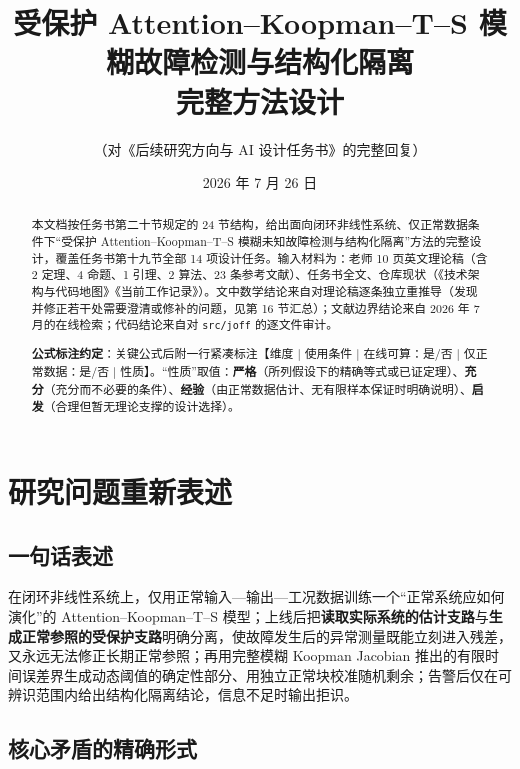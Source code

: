 \documentclass[11pt,a4paper]{ctexart}
\title{\textbf{受保护 Attention--Koopman--T--S 模糊故障检测与结构化隔离\\完整方法设计}}
\author{（对《后续研究方向与 AI 设计任务书》的完整回复）}
\date{2026 年 7 月 26 日}
\theoremstyle{remark}
\begin{document}
\maketitle

\begin{abstract}
本文档按任务书第二十节规定的 24 节结构，给出面向闭环非线性系统、仅正常数据条件下“受保护 Attention--Koopman--T--S 模糊未知故障检测与结构化隔离”方法的完整设计，覆盖任务书第十九节全部 14 项设计任务。输入材料为：老师 10 页英文理论稿（含 2 定理、4 命题、1 引理、2 算法、23 条参考文献）、任务书全文、仓库现状（《技术架构与代码地图》《当前工作记录》）。文中数学结论来自对理论稿逐条独立重推导（发现并修正若干处需要澄清或修补的问题，见第 16 节汇总）；文献边界结论来自 2026 年 7 月的在线检索；代码结论来自对 \texttt{src/joff} 的逐文件审计。

\textbf{公式标注约定}：关键公式后附一行紧凑标注【维度 $\mid$ 使用条件 $\mid$ 在线可算：是/否 $\mid$ 仅正常数据：是/否 $\mid$ 性质】。“性质”取值：\textbf{严格}（所列假设下的精确等式或已证定理）、\textbf{充分}（充分而不必要的条件）、\textbf{经验}（由正常数据估计、无有限样本保证时明确说明）、\textbf{启发}（合理但暂无理论支撑的设计选择）。
\end{abstract}

\tableofcontents
\clearpage

\section{研究问题重新表述}

\subsection{一句话表述}

在闭环非线性系统上，仅用正常输入—输出—工况数据训练一个“正常系统应如何演化”的 Attention--Koopman--T--S 模型；上线后把\textbf{读取实际系统的估计支路}与\textbf{生成正常参照的受保护支路}明确分离，使故障发生后的异常测量既能立刻进入残差，又永远无法修正长期正常参照；再用完整模糊 Koopman Jacobian 推出的有限时间误差界生成动态阈值的确定性部分、用独立正常块校准随机剩余；告警后仅在可辨识范围内给出结构化隔离结论，信息不足时输出拒识。

\subsection{核心矛盾的精确形式}
\end{document}
